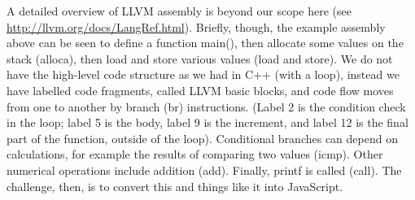 \documentclass[11pt]{proc}
\begin{document}
A detailed overview of LLVM assembly is beyond our scope here (see \url{http://llvm.org/docs/LangRef.html}). Briefly,
though, the example assembly above can be seen to define a
function main(), then allocate some values on the stack (alloca),
then load and store various values (load and store). We do not have
the high-level code structure as we had in C++ (with a loop), instead
we have labelled code fragments, called LLVM basic blocks, and code flow moves
from one to another by branch (br) instructions. (Label 2 is the
condition check in the loop; label 5 is the body, label 9 is the
increment, and label 12 is the final part of the function, outside
of the loop).
Conditional branches
can depend on calculations, for example the results of comparing
two values (icmp). Other numerical operations include addition (add).
Finally, printf is called (call). The challenge, then, is to convert
this and things like it into JavaScript.
\end{document}
